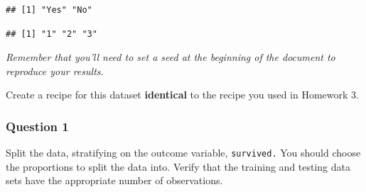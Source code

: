 \documentclass[
]{article}
\newenvironment{Shaded}{\begin{snugshade}}{\end{snugshade}}
\newcommand{\AttributeTok}[1]{\textcolor[rgb]{0.77,0.63,0.00}{#1}}
\newcommand{\CommentTok}[1]{\textcolor[rgb]{0.56,0.35,0.01}{\textit{#1}}}
\newcommand{\ConstantTok}[1]{\textcolor[rgb]{0.00,0.00,0.00}{#1}}
\newcommand{\FunctionTok}[1]{\textcolor[rgb]{0.00,0.00,0.00}{#1}}
\newcommand{\NormalTok}[1]{#1}
\newcommand{\OtherTok}[1]{\textcolor[rgb]{0.56,0.35,0.01}{#1}}
\newcommand{\SpecialCharTok}[1]{\textcolor[rgb]{0.00,0.00,0.00}{#1}}
\newcommand{\StringTok}[1]{\textcolor[rgb]{0.31,0.60,0.02}{#1}}
\begin{document}
\begin{Shaded}
\end{Shaded}

\begin{verbatim}
## [1] "Yes" "No"
\end{verbatim}

\begin{Shaded}
\end{Shaded}

\begin{verbatim}
## [1] "1" "2" "3"
\end{verbatim}

\emph{Remember that you'll need to set a seed at the beginning of the
document to reproduce your results.}

Create a recipe for this dataset \textbf{identical} to the recipe you
used in Homework 3.

\hypertarget{question-1}{%
\subsubsection{Question 1}\label{question-1}}

Split the data, stratifying on the outcome variable, \texttt{survived.}
You should choose the proportions to split the data into. Verify that
the training and testing data sets have the appropriate number of
observations.
\end{document}
